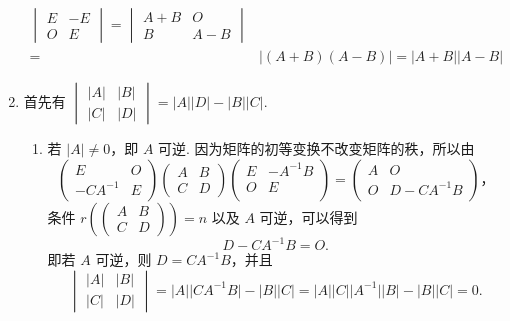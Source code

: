 \begin{enumerate}
\begin{align*}
\begin{vmatrix}
            E & -E \\
            O & E
        \end{vmatrix} = \begin{vmatrix}
            A+B & O \\
            B & A-B
        \end{vmatrix} \\ ={} & \lvert (A+B)(A-B) \rvert = \lvert A+B \rvert \lvert A-B \rvert
    \end{align*}
    \item 首先有 $\begin{vmatrix}
        \lvert A \rvert & \lvert B \rvert \\
        \lvert C \rvert & \lvert D \rvert
    \end{vmatrix} = \lvert A \rvert \lvert D \rvert-\lvert B \rvert \lvert C \rvert$.
    \begin{enumerate}
        \item 若 $\lvert A \rvert \neq 0$，即 $A$ 可逆. 因为矩阵的初等变换不改变矩阵的秩，所以由 \[\begin{pmatrix}
            E & O \\
            -CA^{-1} & E
        \end{pmatrix} \begin{pmatrix}
            A & B \\
            C & D
        \end{pmatrix} \begin{pmatrix}
            E & -A^{-1}B \\
            O & E \\
        \end{pmatrix} = \begin{pmatrix}
            A & O \\
            O & D-CA^{-1}B
        \end{pmatrix}，\] 条件 $r\left(\begin{pmatrix}
            A & B \\
            C & D
        \end{pmatrix}\right) = n$ 以及 $A$ 可逆，可以得到 \[D-CA^{-1}B = O.\] 即若 $A$ 可逆，则 $D = CA^{-1}B$，并且 \[\begin{vmatrix}
            \lvert A \rvert & \lvert B \rvert \\
            \lvert C \rvert & \lvert D \rvert
        \end{vmatrix} = \lvert A \rvert \lvert CA^{-1}B \rvert-\lvert B \rvert \lvert C \rvert = \lvert A \rvert \lvert C \rvert \lvert A^{-1} \rvert \lvert B \rvert-\lvert B \rvert \lvert C \rvert = 0.\]

\end{enumerate}
\end{enumerate}
